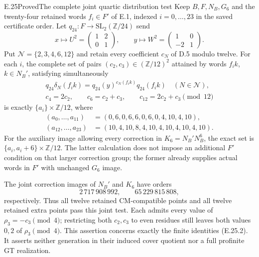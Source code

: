 \begin{statement}{E.25}{Proved}{The complete joint quartic distribution test}
Keep $B,F,N_B,G_6$ and the twenty-four retained words $f_i\in F'$
of E.1, indexed $i=0,\ldots,23$ in the saved certificate order.
Let $q_{24}:F\to\mathrm{SL}_2(\mathbb Z/24)$ send
\[
 x\longmapsto U^2=\begin{pmatrix}1&2\\0&1\end{pmatrix},
 \qquad y\longmapsto W^2=\begin{pmatrix}1&0\\-2&1\end{pmatrix}.
 \tag{E.25.1}
\]
Put $\mathcal N=\{2,3,4,6,12\}$ and retain every coefficient
$c_N$ of D.5 modulo twelve.  For each $i$, the complete set of
pairs $(c_2,c_3)\in(\mathbb Z/12)^2$ attained by words
$f_i k$, $k\in N_B'$, satisfying simultaneously
\[
\begin{gathered}
 q_{24}\delta_N(f_i k)=q_{24}(y)^{c_N(f_i k)}q_{24}(f_i k)
       \quad(N\in\mathcal N),\\
 c_4=2c_2,\qquad c_6=c_2+c_3,\qquad c_{12}=2c_2+c_3
       \pmod {12}
\end{gathered}
 \tag{E.25.2}
\]
is exactly $\{a_i\}\times\mathbb Z/12$, where
\[
\begin{aligned}
 (a_0,\ldots,a_{11})&=(0,6,0,6,6,0,6,0,4,10,4,10),\\
 (a_{12},\ldots,a_{23})&=(10,4,10,8,4,10,4,10,4,10,4,10).
\end{aligned}
 \tag{E.25.3}
\]
For the auxiliary image allowing every correction in
$K_6=N_B'N_B^6$, the exact set is
$\{a_i,a_i+6\}\times\mathbb Z/12$.
The latter calculation does not impose an additional $F'$ condition
on that larger correction group; the former already supplies actual
words in $F'$ with unchanged $G_6$ image.

The joint correction images of $N_B'$ and $K_6$ have orders
\[
             2\,717\,908\,992,
       \qquad65\,229\,815\,808,
 \tag{E.25.4}
\]
respectively.  Thus all twelve retained CM-compatible points and
all twelve retained extra points pass this joint test.  Each admits
every value of $\rho_3=-c_3\pmod4$; restricting both $c_2,c_3$ to
even residues still leaves both values $0,2$ of $\rho_3\pmod4$.
This assertion concerns exactly the finite identities (E.25.2).
It asserts neither generation in their induced cover quotient nor
a full profinite GT realization.
\end{statement}
